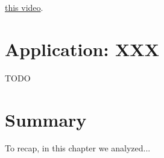 \href{https://www.youtube.com/watch?v=EgsUDby0X1M&pp=ygUcZGlyYWMgYmVsdCB0cmljayBwbGF0ZSB0cmljaw\%3D\%3D}{this video}.



\section{Application: XXX}

TODO



\section{Summary}
To recap, in this chapter we analyzed...

%
